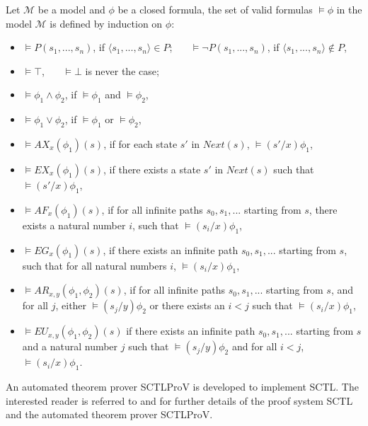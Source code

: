 \documentclass[runningheads]{llncs}
\begin{document}
\begin{definition}
Let $\mathcal{M}$ be a model and $\phi$ be a closed formula, the set of valid formulas $\models \phi$ in the model $\mathcal{M}$ is defined by induction on $\phi$:
 
\begin{itemize}
        \item $\models P(s_1,...,s_n)$, if $\langle s_1,...,s_n\rangle \in P$; \  \  \  $\models \neg P(s_1,...,s_n)$, if $\langle s_1,...,s_n\rangle \notin P$,
        \item $\models \top$, \  \   \  $\models \bot$ is never the case;
        \item $\models \phi_1\wedge\phi_2$, if $\models \phi_1$ and $\models \phi_2$,
        \item $\models \phi_1\vee\phi_2$, if $\models \phi_1$ or $\models \phi_2$,
        \item $\models AX_x(\phi_1)(s)$, if for each state $s'$ in $Next(s)$, $\models (s'/x)\phi_1$,
        \item $\models EX_x(\phi_1)(s)$, if there exists a state $s'$ in $Next(s)$ such that $\models (s'/x)\phi_1$,
        \item $\models AF_x(\phi_1)(s)$, if for all infinite paths $s_0,s_1,...$ starting from $s$, there exists a natural number $i$, such that $\models (s_i/x)\phi_1$,
        \item $\models EG_x(\phi_1)(s)$, if there exists an infinite path $s_0,s_1,...$ starting from $s$, such that for all natural numbers $i$, $\models (s_i/x)\phi_1$,
        \item $\models AR_{x, y}(\phi_1,\phi_2)(s)$, if for all infinite paths $s_0,s_1,...$ starting from $s$, and for all $j$, either $\models (s_j/y)\phi_2$ or there exists an $i<j$ such that $\models (s_i/x)\phi_1$,
        \item $\models EU_{x, y}(\phi_1,\phi_2)(s)$ if there exists an infinite path $s_0,s_1,...$ starting from $s$ and a natural number $j$ such that $\models (s_j/y)\phi_2$ and for all $i<j$, $\models (s_i/x)\phi_1$.
\end{itemize}
\end{definition}
 
An automated theorem prover \textsf{SCTLProV} is developed to implement \textsf{SCTL}.
The interested reader is referred to \cite{dowek2013logical} and \cite{LiuDJJ16} for further details of the proof system \textsf{SCTL} and the automated theorem prover \textsf{SCTLProV}.
 
\end{document}
